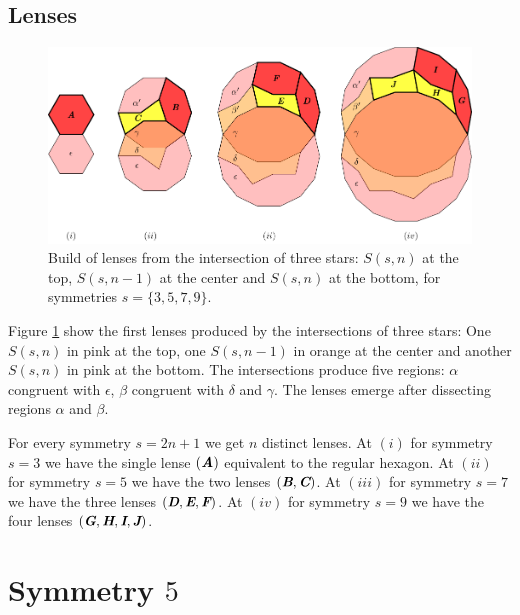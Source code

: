\documentclass[11pt]{article}
\def\mathbi#1{\textbf{\em #1}}
\begin{document}
\subsection{Lenses}

\begin{figure}[H]
\centering
\includegraphics[scale=1]{stars/inter-2}
\caption{Build of lenses from the intersection of three stars: $S(s,n)$ at the top, $S(s,n-1)$ at the center and $S(s,n)$ at the bottom, for symmetries $s=\{3,5,7,9\}$.}
\label{fig:stars-inter-2}
\end{figure}

Figure \ref{fig:stars-inter-2} show the first lenses produced by the intersections of three stars: One $S(s,n)$ in pink at the top, one $S(s,n-1)$ in orange at the center and another $S(s,n)$ in pink at the bottom. The intersections produce five regions: $\alpha$ congruent with $\epsilon$, $\beta$ congruent with $\delta$ and $\gamma$. The lenses emerge after dissecting regions $\alpha$ and $\beta$.

For every symmetry $s=2n+1$ we get $n$ distinct lenses. At $(i)$ for symmetry $s=3$ we have the single lense $(\mathbi{A})$ equivalent to the regular hexagon. At $(ii)$ for symmetry $s=5$ we have the two lenses $(\mathbi{B},\mathbi{C})$. At $(iii)$ for symmetry $s=7$ we have the three lenses $(\mathbi{D},\mathbi{E},\mathbi{F})$. At $(iv)$ for symmetry $s=9$ we have the four lenses $(\mathbi{G},\mathbi{H},\mathbi{I},\mathbi{J})$.

\section{Symmetry $5$}
\end{document}
